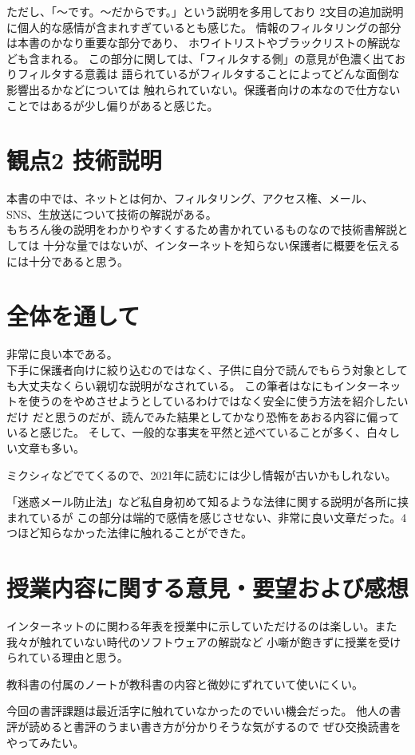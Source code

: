 \documentclass[titlepage]{jarticle}
\begin{document}
ただし、「～です。～だからです。」という説明を多用しており
2文目の追加説明に個人的な感情が含まれすぎているとも感じた。
情報のフィルタリングの部分は本書のかなり重要な部分であり、
ホワイトリストやブラックリストの解説なども含まれる。
この部分に関しては、「フィルタする側」の意見が色濃く出ておりフィルタする意義は
語られているがフィルタすることによってどんな面倒な影響出るかなどについては
触れられていない。保護者向けの本なので仕方ないことではあるが少し偏りがあると感じた。

\section{観点2 技術説明}
本書の中では、ネットとは何か、フィルタリング、アクセス権、メール、
SNS、生放送について技術の解説がある。\\
もちろん後の説明をわかりやすくするため書かれているものなので技術書解説としては
十分な量ではないが、インターネットを知らない保護者に概要を伝えるには十分であると思う。

\section{全体を通して}
非常に良い本である。\\
下手に保護者向けに絞り込むのではなく、子供に自分で読んでもらう対象としても大丈夫なくらい親切な説明がなされている。
この筆者はなにもインターネットを使うのをやめさせようとしているわけではなく安全に使う方法を紹介したいだけ
だと思うのだが、読んでみた結果としてかなり恐怖をあおる内容に偏っていると感じた。
そして、一般的な事実を平然と述べていることが多く、白々しい文章も多い。

ミクシィなどでてくるので、2021年に読むには少し情報が古いかもしれない。

「迷惑メール防止法」など私自身初めて知るような法律に関する説明が各所に挟まれているが
この部分は端的で感情を感じさせない、非常に良い文章だった。4つほど知らなかった法律に触れることができた。

\section{授業内容に関する意見・要望および感想}
インターネットのに関わる年表を授業中に示していただけるのは楽しい。また我々が触れていない時代のソフトウェアの解説など
小噺が飽きずに授業を受けられている理由と思う。

教科書の付属のノートが教科書の内容と微妙にずれていて使いにくい。

今回の書評課題は最近活字に触れていなかったのでいい機会だった。
他人の書評が読めると書評のうまい書き方が分かりそうな気がするので
ぜひ交換読書をやってみたい。
\end{document}

